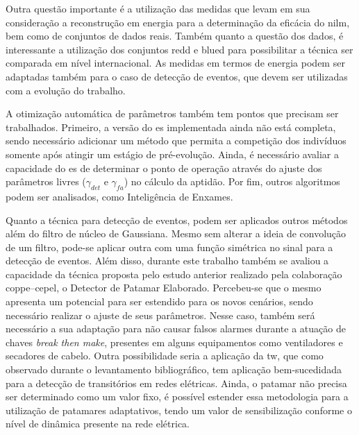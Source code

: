 Outra questão importante é a utilização das medidas que levam em sua
consideração a reconstrução em energia para a determinação da eficácia
do \acs{nilm}, bem como de conjuntos de dados reais. Também quanto a
questão dos dados, é interessante a utilização dos conjuntos
\acs{redd} e \acs{blued} para possibilitar a técnica ser comparada em
nível internacional. As medidas em termos de energia podem ser
adaptadas também para o caso de detecção de eventos, que devem ser
utilizadas com a evolução do trabalho.

A otimização automática de parâmetros também tem pontos que precisam
ser trabalhados. Primeiro, a versão do \acs{es} implementada ainda não
está completa, sendo necessário adicionar um método que permita a
competição dos indivíduos somente após atingir um estágio de
pré-evolução. Ainda, é necessário avaliar a capacidade do \acs{es} de
determinar o ponto de operação através do ajuste dos parâmetros livres
($\gamma_{det}$ e $\gamma_{fa}$) no cálculo da aptidão. Por
fim, outros algoritmos podem ser analisados, como Inteligência de
Enxames.

Quanto a técnica para detecção de eventos, podem ser aplicados outros
métodos além do filtro de núcleo de Gaussiana. Mesmo sem alterar a
ideia de convolução de um filtro, pode-se aplicar outra com uma função
simétrica no sinal para a detecção de eventos. Além disso,
durante este trabalho também se avaliou a capacidade da técnica
proposta pelo estudo anterior realizado pela colaboração
\acs{coppe}--\acs{cepel}, o Detector de Patamar Elaborado.
Percebeu-se que o mesmo apresenta um potencial para ser estendido para
os novos cenários, sendo necessário realizar o ajuste de seus
parâmetros. Nesse caso, também será necessário a sua adaptação para
não causar falsos alarmes durante a atuação de chaves \emph{break then
make}, presentes em alguns equipamentos como ventiladores e secadores
de cabelo. Outra possibilidade seria a aplicação da \acl{tw}, que como
observado durante o levantamento bibliográfico, tem aplicação
bem-sucedidada para a detecção de transitórios em redes elétricas.
Ainda, o patamar não precisa ser determinado como um valor fixo, é
possível estender essa metodologia para a utilização de patamares
adaptativos, tendo um valor de sensibilização conforme o nível de
dinâmica presente na rede elétrica.



